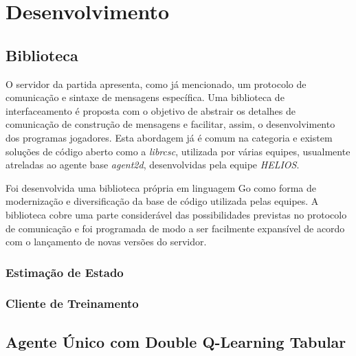 \chapter{Desenvolvimento \label{chap:Desenvolvimento}}



\section{Biblioteca}

O servidor da partida apresenta, como já mencionado, um protocolo de comunicação e sintaxe de mensagens específica. Uma biblioteca de interfaceamento é proposta com o objetivo de abstrair os detalhes de comunicação de construção de mensagens e facilitar, assim, o desenvolvimento dos programas jogadores. Esta abordagem já é comum na categoria e existem soluções de código aberto como a \textit{librcsc}, utilizada por várias equipes, usualmente atreladas ao agente base \textit{agent2d}, desenvolvidas pela equipe \textit{HELIOS}.

Foi desenvolvida uma biblioteca própria em linguagem Go como forma de modernização e diversificação da base de código utilizada pelas equipes. A biblioteca cobre uma parte considerável das possibilidades previstas no protocolo de comunicação e foi programada de modo a ser facilmente expansível de acordo com o lançamento de novas versões do servidor.


\subsection{Estimação de Estado}

\subsection{Cliente de Treinamento}


\section{Agente Único com Double Q-Learning Tabular}



